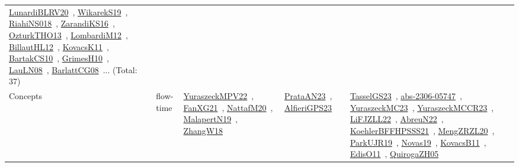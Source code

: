 {\begin{longtable}{lp{3cm}>{\raggedright\arraybackslash}p{6cm}>{\raggedright\arraybackslash}p{6cm}>{\raggedright\arraybackslash}p{8cm}}
\href{articles/LunardiBLRV20.pdf}{LunardiBLRV20}~\cite{LunardiBLRV20}, \href{articles/WikarekS19.pdf}{WikarekS19}~\cite{WikarekS19}, \href{papers/RiahiNS018.pdf}{RiahiNS018}~\cite{RiahiNS018}, \href{articles/ZarandiKS16.pdf}{ZarandiKS16}~\cite{ZarandiKS16}, \href{articles/OzturkTHO13.pdf}{OzturkTHO13}~\cite{OzturkTHO13}, \href{articles/LombardiM12.pdf}{LombardiM12}~\cite{LombardiM12}, \href{papers/BillautHL12.pdf}{BillautHL12}~\cite{BillautHL12}, \href{articles/KovacsK11.pdf}{KovacsK11}~\cite{KovacsK11}, \href{articles/BartakCS10.pdf}{BartakCS10}~\cite{BartakCS10}, \href{papers/GrimesH10.pdf}{GrimesH10}~\cite{GrimesH10}, \href{papers/LauLN08.pdf}{LauLN08}~\cite{LauLN08}, \href{papers/BarlattCG08.pdf}{BarlattCG08}~\cite{BarlattCG08}... (Total: 37)\\
Concepts & flow-time & \href{articles/YuraszeckMPV22.pdf}{YuraszeckMPV22}~\cite{YuraszeckMPV22}, \href{articles/FanXG21.pdf}{FanXG21}~\cite{FanXG21}, \href{papers/NattafM20.pdf}{NattafM20}~\cite{NattafM20}, \href{papers/MalapertN19.pdf}{MalapertN19}~\cite{MalapertN19}, \href{articles/ZhangW18.pdf}{ZhangW18}~\cite{ZhangW18} & \href{articles/PrataAN23.pdf}{PrataAN23}~\cite{PrataAN23}, \href{articles/AlfieriGPS23.pdf}{AlfieriGPS23}~\cite{AlfieriGPS23} & \href{papers/TasselGS23.pdf}{TasselGS23}~\cite{TasselGS23}, \href{articles/abs-2306-05747.pdf}{abs-2306-05747}~\cite{abs-2306-05747}, \href{papers/YuraszeckMC23.pdf}{YuraszeckMC23}~\cite{YuraszeckMC23}, \href{articles/YuraszeckMCCR23.pdf}{YuraszeckMCCR23}~\cite{YuraszeckMCCR23}, \href{papers/LiFJZLL22.pdf}{LiFJZLL22}~\cite{LiFJZLL22}, \href{articles/AbreuN22.pdf}{AbreuN22}~\cite{AbreuN22}, \href{articles/KoehlerBFFHPSSS21.pdf}{KoehlerBFFHPSSS21}~\cite{KoehlerBFFHPSSS21}, \href{articles/MengZRZL20.pdf}{MengZRZL20}~\cite{MengZRZL20}, \href{papers/ParkUJR19.pdf}{ParkUJR19}~\cite{ParkUJR19}, \href{articles/Novas19.pdf}{Novas19}~\cite{Novas19}, \href{articles/KovacsB11.pdf}{KovacsB11}~\cite{KovacsB11}, \href{papers/EdisO11.pdf}{EdisO11}~\cite{EdisO11}, \href{papers/QuirogaZH05.pdf}{QuirogaZH05}~\cite{QuirogaZH05}\\

\end{longtable}}

